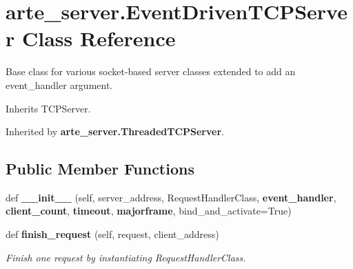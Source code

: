 \section{arte\+\_\+server.\+Event\+Driven\+T\+C\+P\+Server Class Reference}
\label{classarte__server_1_1_event_driven_t_c_p_server}


Base class for various socket-\/based server classes extended to add an event\+\_\+handler argument.  




Inherits T\+C\+P\+Server.



Inherited by {\bf arte\+\_\+server.\+Threaded\+T\+C\+P\+Server}.

\subsection*{Public Member Functions}
\begin{DoxyCompactItemize}
\item 
def {\bfseries \+\_\+\+\_\+init\+\_\+\+\_\+} (self, server\+\_\+address, Request\+Handler\+Class, {\bf event\+\_\+handler}, {\bf client\+\_\+count}, {\bf timeout}, {\bf majorframe}, bind\+\_\+and\+\_\+activate=True)\label{classarte__server_1_1_event_driven_t_c_p_server_a1b67d692e00b8a7a412c6583999be742}

\item 
def {\bf finish\+\_\+request} (self, request, client\+\_\+address)
\begin{DoxyCompactList}\small\item\em Finish one request by instantiating Request\+Handler\+Class. \end{DoxyCompactList}\end{DoxyCompactItemize}
